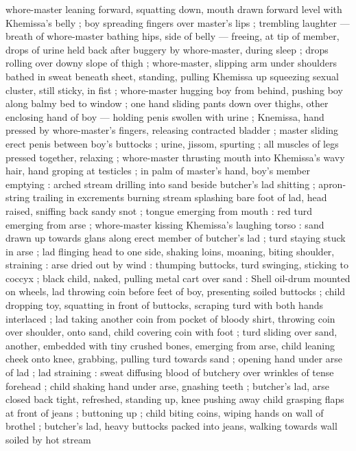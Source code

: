 whore-master leaning forward, squatting down, mouth drawn forward 
level with Khemissa's belly ; boy spreading fingers over master's lips 
; trembling laughter --- breath of whore-master bathing hips, side of 
belly --- freeing, at tip of member, drops of urine held back after 
buggery by whore-master, during sleep ; drops rolling over downy 
slope of thigh ; whore-master, slipping arm under shoulders bathed 
in sweat beneath sheet, standing, pulling Khemissa up squeezing 
sexual cluster, still sticky, in fist ; whore-master hugging boy from 
behind, pushing boy along balmy bed to window ; one hand sliding 
pants down over thighs, other enclosing hand of boy --- holding 
penis swollen with urine ; Knemissa, hand pressed by whore-master's 
fingers, releasing contracted bladder ; master sliding erect penis 
between boy's buttocks ; urine, jissom, spurting ; all muscles of legs 
pressed together, relaxing ; whore-master thrusting mouth into 
Khemissa's wavy hair, hand groping at testicles ; in palm of master's 
hand, boy's member emptying : arched stream drilling into sand 
beside butcher's lad shitting ; apron-string trailing in excrements 
burning stream splashing bare foot of lad, head raised, sniffing back 
sandy snot ; tongue emerging from mouth : red turd emerging from 
arse ; whore-master kissing Khemissa's laughing torso : sand drawn 
up towards glans along erect member of butcher's lad ; turd staying 
stuck in arse ; lad flinging head to one side, shaking loins, moaning, 
biting shoulder, straining : arse dried out by wind : thumping 
buttocks, turd swinging, sticking to coccyx ; black child, naked, 
pulling metal cart over sand : Shell oil-drum mounted on wheels, lad 
throwing coin before feet of boy, presenting soiled buttocks ; child 
dropping toy, squatting in front of buttocks, scraping turd with both 
hands interlaced ; lad taking another coin from pocket of bloody 
shirt, throwing coin over shoulder, onto sand, child covering coin with 
foot ; turd sliding over sand, another, embedded with tiny crushed 
bones, emerging from arse, child leaning cheek onto knee, grabbing, 
pulling turd towards sand ; opening hand under arse of lad ; lad 
straining : sweat diffusing blood of butchery over wrinkles of tense 
forehead ; child shaking hand under arse, gnashing teeth ; butcher's 
lad, arse closed back tight, refreshed, standing up, knee pushing 
away child grasping flaps at front of jeans ; buttoning up ; child 
biting coins, wiping hands on wall of brothel ; butcher's lad, heavy 
buttocks packed into jeans, walking towards wall soiled by hot stream 
